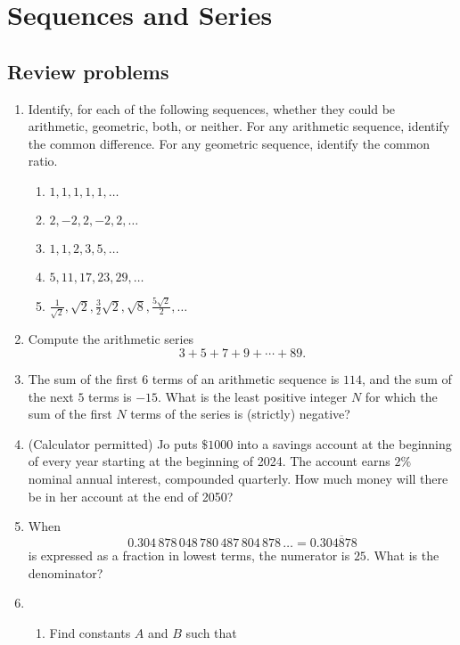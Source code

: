 \section{Sequences and Series}

\subsection{Review problems}

\begin{enumerate}
\item Identify, for each of the following sequences, whether they could be arithmetic, geometric, both, or neither. For any arithmetic sequence, identify the common difference. For any geometric sequence, identify the common ratio. 
\begin{enumerate}
\item $1, 1, 1, 1, 1, \ldots$
\item $2, -2, 2, -2, 2, \ldots$
\item $1, 1, 2, 3, 5, \ldots$
\item $5, 11, 17, 23, 29, \ldots$
\item $\frac{1}{\sqrt{2}}, \sqrt{2}, \frac{3}{2}\sqrt{2}, \sqrt{8}, \frac{5\sqrt{2}}{2}, \ldots$
\end{enumerate}
\item Compute the arithmetic series
\begin{equation*}
3 + 5 + 7 + 9 + \cdots + 89.
\end{equation*}
\item The sum of the first $6$ terms of an arithmetic sequence is $114$, and the sum of the next $5$ terms is $-15$. What is the least positive integer $N$ for which the sum of the first $N$ terms of the series is (strictly) negative?
\item (Calculator permitted) Jo puts $\$1000$ into a savings account at the beginning of every year starting at the beginning of 2024. The account earns $2\%$ nominal annual interest, compounded quarterly. How much money will there be in her account at the end of 2050?
\item When
\begin{equation*}
0.304\,878\,048\,780\,487\,804\,878\,\ldots = 0.3\overline{04878}
\end{equation*}
is expressed as a fraction in lowest terms, the numerator is $25$. What is the denominator?
\item \begin{enumerate}
\item Find constants $A$ and $B$ such that

\end{enumerate}
\end{enumerate}
